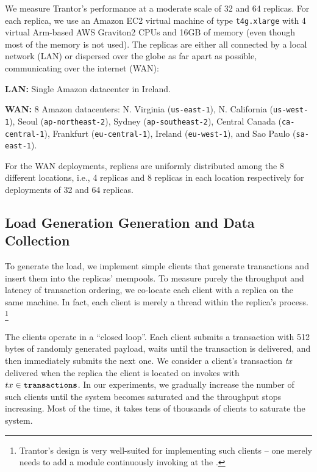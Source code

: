 \documentclass{article}
\begin{document}
We measure Trantor's performance at a moderate scale of 32 and 64 replicas.
For each replica, we use an Amazon EC2 virtual machine of type \texttt{t4g.xlarge}
with 4 virtual Arm-based AWS Graviton2 CPUs and 16GB of memory (even though most of the memory is not used).
The replicas are either all connected by a local network (LAN) or dispersed over the globe as far apart as possible, communicating over the internet (WAN):
\begin{compactitem}
    \item \textbf{LAN:} Single Amazon datacenter in Ireland.
    \item \textbf{WAN:} 8 Amazon datacenters:
    N. Virginia (\texttt{us-east-1}),
    N. California (\texttt{us-west-1}),
    Seoul (\texttt{ap-northeast-2}),
    Sydney (\texttt{ap-southeast-2}),
    Central Canada (\texttt{ca-central-1}),
    Frankfurt (\texttt{eu-central-1}),
    Ireland (\texttt{eu-west-1}),
    and Sao Paulo (\texttt{sa-east-1}).
\end{compactitem}
For the WAN deployments, replicas are uniformly distributed among the 8 different locations,
i.e., 4 replicas and 8 replicas in each location respectively for deployments of 32 and 64 replicas.

\subsection{Load Generation Generation and Data Collection}

To generate the load, we implement simple clients that generate transactions and insert them into the replicas' mempools.
To measure purely the throughput and latency of transaction ordering, we co-locate each client with a replica on the same machine.
In fact, each client is merely a thread within the replica's process.%
\footnote{Trantor's design is very well-suited for implementing such clients --
one merely needs to add a module continuously invoking  at the .}

The clients operate in a “closed loop”.
Each client submits a transaction with 512 bytes of randomly generated payload, waits until the transaction is delivered, and then immediately submits the next one.
We consider a client's transaction \textit{tx} delivered when the replica the client is located on invokes  with $tx \in \texttt{transactions}$.
In our experiments, we gradually increase the number of such clients until the system becomes saturated and the throughput stops increasing.
Most of the time, it takes tens of thousands of clients to saturate the system.
\end{document}
